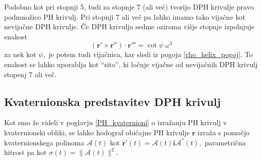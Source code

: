 \documentclass[12pt,a4paper,twoside]{article}
\theoremstyle{definition} %
\theoremstyle{plain} %
\theoremstyle{primerstyle}
\numberwithin{equation}{section}  %
\newcommand{\rV}{\mathbf{r}}
\newcommand{\iV}{\mathbf{i}}
\newcommand{\AQ}{\mathcal{A}}
\begin{document}
Podobno kot pri stopnji 5, tudi za stopnje 7 (ali več) tvorijo DPH krivulje pravo podmnožico PH krivulj. Pri stopnji 7 ali več pa lahko imamo tako vijačne kot nevijačne DPH krivulje. Če DPH krivulja sedme oziroma višje stopnje izpolnjuje enakost
\begin{equation}
	\label{mesani_kotangens_omega}
	(\rV'\times\rV'')\cdot\rV'''=\cot\psi\ \omega^3
\end{equation}
za nek kot $\psi,$ je potem tudi vijačnica, kar sledi iz pogoja \eqref{rho_helix_pogoj}. To enakost se lahko uporablja kot ``sito'', ki ločuje vijačne od nevijačnih DPH krivulj stopenj 7 ali več.

\subsection{Kvaternionska predstavitev DPH krivulj}

Kot smo že videli v poglavju \ref{PH_kvaternioni} o izražanju PH krivulj v kvaternionski obliki, se lahko hodograf običajne PH krivulje $\rV$ izraža s pomočjo kvaternionskega polinoma $\AQ(t)$ kot $\rV'(t)=\AQ(t)\iV\AQ^*(t),$ parametrična hitrost pa kot $\sigma(t)=\lVert \AQ(t) \rVert^2.$ 
\end{document}
